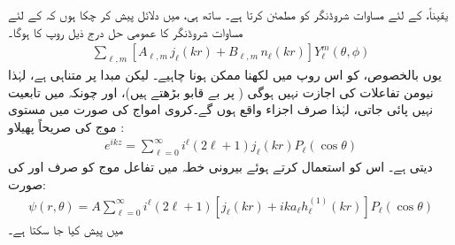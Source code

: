 یقیناً،  کے لئے مساوات شروڈنگر کو  مطمئن کرتا ہے۔ ساتھ ہی، میں دلائل پیش کر چکا ہوں کہ  کے لئے مساوات شروڈنگر کا عمومی حل درج ذیل روپ کا ہوگا۔
\begin{align*}
	\sum_{\ell, m}\left[A_{\ell, m}\,j_{\ell}(kr)+B_{\ell, m}\,n_{\ell}(kr)\right]Y_{\ell}^m(\theta, \phi)
\end{align*}
یوں بالخصوص،  کو اس روپ میں لکھنا ممکن ہونا چاہیے۔ لیکن مبدا پر  متناہی ہے، لہٰذا نیومن تفاعلات کی اجازت نہیں ہوگی ( پر  بے قابو بڑھتے ہیں)، اور چونکہ  میں تابعیت  نہیں پائی جاتی، لہٰذا صرف  اجزاء واقع ہوں گے۔کروی امواج کی صورت میں مستوی موج کی صریحاً پھیلاو :
\begin{align}\label{مساوات_بکھراو_کلیہ_ریلے}
	e^{ikz} = \sum_{\ell=0}^{\infty}i^{\ell}(2\ell+1)j_{\ell}(kr)P_{\ell}(\cos\theta)
\end{align}
 دیتی ہے۔ اس کو استعمال کرتے ہوئے بیرونی خطہ میں تفاعل موج کو صرف  اور  کی صورت:
\begin{align}
	\psi(r, \theta) = A\sum_{\ell=0}^{\infty}i^{\ell}(2\ell+1)\left[j_{\ell}(kr)+ika_{\ell}h_{\ell}^{(1)}(kr)\right]P_{\ell}(\cos\theta)
\end{align}
 میں پیش کیا جا سکتا ہے۔

